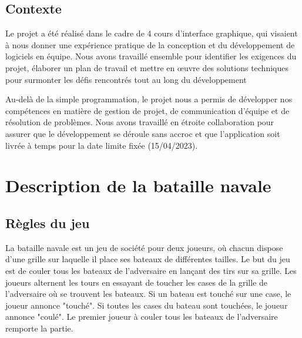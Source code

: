 \documentclass[12pt]{article}
\begin{document}
\subsection{Contexte}
Le projet a été réalisé dans le cadre de 4 cours d'interface graphique, qui visaient à nous donner une expérience pratique de la conception et du développement de logiciels en équipe. Nous avons travaillé ensemble pour identifier les exigences du projet, élaborer un plan de travail et mettre en œuvre des solutions techniques pour surmonter les défis rencontrés tout au long du développement 

Au-delà de la simple programmation, le projet nous a permis de développer nos compétences en matière de gestion de projet, de communication d'équipe et de résolution de problèmes. Nous avons travaillé en étroite collaboration pour assurer que le développement se déroule sans accroc et que l'application soit livrée à temps pour la date limite fixée (15/04/2023).
\newpage 

\section{Description de la bataille navale}

\subsection{Règles du jeu}
La bataille navale est un jeu de société pour deux joueurs, où chacun dispose d'une grille sur laquelle il place ses bateaux de différentes tailles. Le but du jeu est de couler tous les bateaux de l'adversaire en lançant des tirs sur sa grille. Les joueurs alternent les tours en essayant de toucher les cases de la grille de l'adversaire où se trouvent les bateaux. Si un bateau est touché sur une case, le joueur annonce "touché". Si toutes les cases du bateau sont touchées, le joueur annonce "coulé". Le premier joueur à couler tous les bateaux de l'adversaire remporte la partie.
\end{document}
